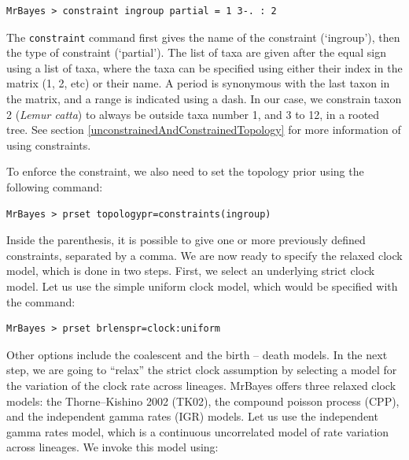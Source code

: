\documentclass[12pt]{book}
\newcommand{\ttt}[1]{\texttt{#1}}
\begin{document}
\small
\begin{singlespacing}
\begin{verbatim}
MrBayes > constraint ingroup partial = 1 3-. : 2
\end{verbatim}
\end{singlespacing}
\normalsize

The \ttt{constraint} command first gives the name of the constraint (`ingroup'), then the type of
constraint (`partial'). The list of taxa are given after the equal sign using a list of taxa, where
the taxa can be specified using either their index in the matrix (1, 2, etc) or their name. A
period is synonymous with the last taxon in the matrix, and a range is indicated using a dash. In
our case, we constrain taxon 2 (\textit{Lemur catta}) to always be outside taxa number 1, and 3 to
12, in a rooted tree. See section \ref{unconstrainedAndConstrainedTopology} for more information of
using constraints.

To enforce the constraint, we also need to set the topology prior using the following command:

\small
\begin{singlespacing}
\begin{verbatim}
MrBayes > prset topologypr=constraints(ingroup)
\end{verbatim}
\end{singlespacing}
\normalsize

Inside the parenthesis, it is possible to give one or more previously defined constraints,
separated by a comma. We are now ready to specify the relaxed clock model, which is done in two
steps. First, we select an underlying strict clock model. Let us use the simple uniform clock
model, which would be specified with the command:

\small
\begin{singlespacing}
\begin{verbatim}
MrBayes > prset brlenspr=clock:uniform
\end{verbatim}
\end{singlespacing}
\normalsize

Other options include the coalescent and the birth -- death models. In the next step, we are going
to ``relax'' the strict clock assumption by selecting a model for the variation of the clock rate
across lineages. MrBayes offers three relaxed clock models: the Thorne--Kishino 2002 (TK02), the
compound poisson process (CPP), and the independent gamma rates (IGR) models. Let us use the
independent gamma rates model, which is a continuous uncorrelated model of rate variation across
lineages. We invoke this model using:
\end{document}
